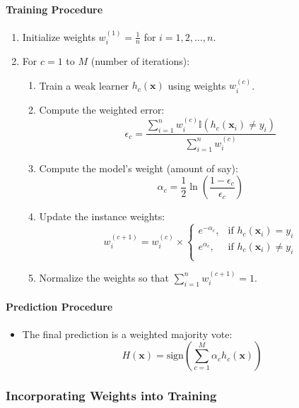 \documentclass{article}
\begin{document}
\paragraph{Training Procedure}

\begin{enumerate}
    \item Initialize weights $w_i^{(1)} = \frac{1}{n}$ for $i = 1, 2, \dots, n$.
    \item For $c = 1$ to $M$ (number of iterations):
    \begin{enumerate}
        \item Train a weak learner $h_c(\mathbf{x})$ using weights $w_i^{(c)}$.
        \item Compute the weighted error:
        \[
        \epsilon_c = \frac{\sum_{i=1}^n w_i^{(c)} \mathbb{I}\left( h_c(\mathbf{x}_i) \neq y_i \right)}{\sum_{i=1}^n w_i^{(c)}}
        \]
        \item Compute the model's weight (amount of say):
        \[
        \alpha_c = \frac{1}{2} \ln\left( \frac{1 - \epsilon_c}{\epsilon_c} \right)
        \]
        \item Update the instance weights:
        \[
        w_i^{(c+1)} = w_i^{(c)} \times \begin{cases}
            e^{-\alpha_c}, & \text{if } h_c(\mathbf{x}_i) = y_i \\
            e^{\alpha_c}, & \text{if } h_c(\mathbf{x}_i) \neq y_i \\
        \end{cases}
        \]
        \item Normalize the weights so that $\sum_{i=1}^n w_i^{(c+1)} = 1$.
    \end{enumerate}
\end{enumerate}

\paragraph{Prediction Procedure}

\begin{itemize}
    \item The final prediction is a weighted majority vote:
    \[
    H(\mathbf{x}) = \text{sign}\left( \sum_{c=1}^M \alpha_c h_c(\mathbf{x}) \right)
    \]
\end{itemize}

\subsubsection{Incorporating Weights into Training}
\end{document}
